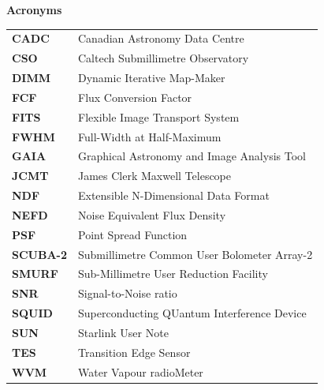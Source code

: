 \documentclass[twoside,11pt]{article}
\newenvironment{latexonly}{}{}
\renewcommand{\_}{\texttt{\symbol{95}}}
\begin{document}
\newpage
\begin{latexonly}

   \vspace{10mm}
   \begin{center}
      {\Large\textbf{Acronyms}}
   \end{center}

\setlength{\extrarowheight}{3pt}
\begin{table}[h!]
\begin{tabular}{ll}
\textbf{CADC}   & Canadian Astronomy Data Centre\\
\textbf{CSO}    & Caltech Submillimetre Observatory\\
\textbf{DIMM}   & Dynamic Iterative Map-Maker\\
\textbf{FCF}    & Flux Conversion Factor\\
\textbf{FITS}   & Flexible Image Transport System\\
\textbf{FWHM}   & Full-Width at Half-Maximum\\
\textbf{GAIA}   & Graphical Astronomy and Image Analysis Tool\\
\textbf{JCMT}   & James Clerk Maxwell Telescope\\
\textbf{NDF}    & Extensible N-Dimensional Data Format\\
\textbf{NEFD}   & Noise Equivalent Flux Density\\
\textbf{PSF}    & Point Spread Function\\
\textbf{SCUBA-2}& Submillimetre Common User Bolometer Array-2\\
\textbf{SMURF}  & Sub-Millimetre User Reduction Facility\\
\textbf{SNR}    & Signal-to-Noise ratio\\
\textbf{SQUID}  & Superconducting QUantum Interference Device\\
\textbf{SUN}    & Starlink User Note\\
\textbf{TES}    & Transition Edge Sensor\\
\textbf{WVM}    & Water Vapour radioMeter\\
\end{tabular}
\end{table}

\end{latexonly}

\end{document}
